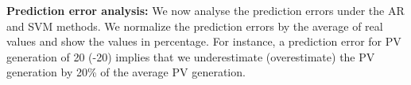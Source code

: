 \textbf{Prediction error analysis:} We now analyse the prediction errors under the AR and SVM methods.
We normalize the prediction errors by the average of real values and
show the values in percentage. For instance, a prediction error for PV
generation of 20 (-20) implies that we underestimate (overestimate)
the PV generation by 20\% of the average PV generation.




